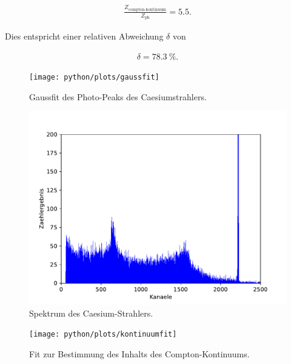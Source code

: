\begin{align*}
  \frac{Z_\text{compton-kontinuum}}{Z_\text{ph}} = 5.5 .
\end{align*}

Dies entspricht einer relativen Abweichung $\delta$ von

\begin{align*}
  \delta = \SI{78.3}{\percent} .
\end{align*}

\FloatBarrier
\begin{figure}
  \centering
  \texttt{[image: python/plots/gaussfit]}
  \caption{Gaussfit des Photo-Peaks des Caesiumstrahlers.}
  \label{fig:gfit2}
\end{figure}

\begin{figure}
  \centering
  \includegraphics[width=\textwidth]{python/plots/spec2.pdf}
  \caption{Spektrum des Caesium-Strahlers.}
  \label{fig:spectrum_caesium}
\end{figure}

\begin{figure}
  \texttt{[image: python/plots/kontinuumfit]}
  \caption{Fit zur Bestimmung des Inhalts des Compton-Kontinuums.}
  \label{fig:kontinuumplot}
\end{figure}
\FloatBarrier



